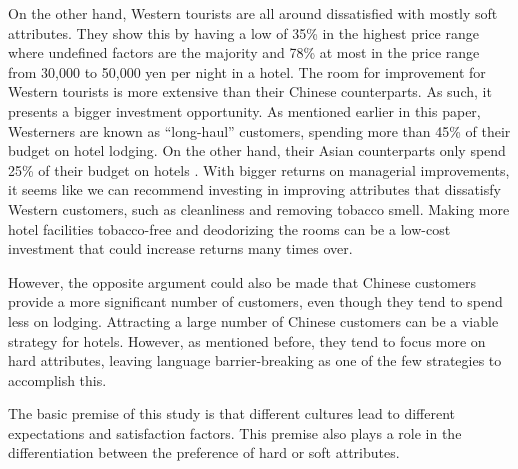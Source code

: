 \documentclass[smallextended,natbib]{svjour3}       %
\begin{document}
    On the other hand, Western tourists are all around dissatisfied with mostly soft attributes. They show this by having a low of 35\% in the highest price range where undefined factors are the majority and 78\% at most in the price range from 30,000 to 50,000 yen per night in a hotel. The room for improvement for Western tourists is more extensive than their Chinese counterparts. As such, it presents a bigger investment opportunity. As mentioned earlier in this paper, Westerners are known as ``long-haul'' customers, spending more than 45\% of their budget on hotel lodging.
    On the other hand, their Asian counterparts only spend 25\% of their budget on hotels \cite[][]{choi2000}. With bigger returns on managerial improvements, it seems like we can recommend investing in improving attributes that dissatisfy Western customers, such as cleanliness and removing tobacco smell. Making more hotel facilities tobacco-free and deodorizing the rooms can be a low-cost investment that could increase returns many times over.

    However, the opposite argument could also be made that Chinese customers provide a more significant number of customers, even though they tend to spend less on lodging. Attracting a large number of Chinese customers can be a viable strategy for hotels. However, as mentioned before, they tend to focus more on hard attributes, leaving language barrier-breaking as one of the few strategies to accomplish this.

    The basic premise of this study is that different cultures lead to different expectations and satisfaction factors. This premise also plays a role in the differentiation between the preference of hard or soft attributes.
\end{document}
